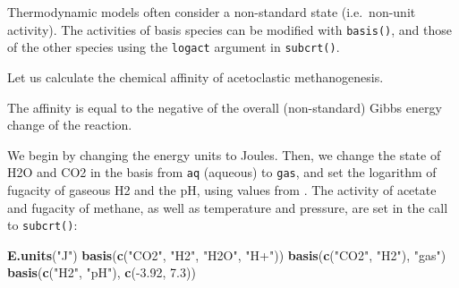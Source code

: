 \documentclass[]{tufte-book}
\newenvironment{Shaded}{}{}
\newcommand{\KeywordTok}[1]{\textcolor[rgb]{0.00,0.44,0.13}{\textbf{#1}}}
\newcommand{\DataTypeTok}[1]{\textcolor[rgb]{0.56,0.13,0.00}{#1}}
\newcommand{\DecValTok}[1]{\textcolor[rgb]{0.25,0.63,0.44}{#1}}
\newcommand{\FloatTok}[1]{\textcolor[rgb]{0.25,0.63,0.44}{#1}}
\newcommand{\StringTok}[1]{\textcolor[rgb]{0.25,0.44,0.63}{#1}}
\newcommand{\OperatorTok}[1]{\textcolor[rgb]{0.40,0.40,0.40}{#1}}
\newcommand{\NormalTok}[1]{#1}
\begin{document}
Thermodynamic models often consider a non-standard state (i.e.~non-unit
activity). The activities of basis species can be modified with
{\texttt{basis()}}, and those of the other species using the
\texttt{logact} argument in {\texttt{subcrt()}}.

Let us calculate the chemical affinity of acetoclastic methanogenesis.

\begin{marginfigure}
The affinity is equal to the negative of the overall (non-standard)
Gibbs energy change of the reaction.
\end{marginfigure}

We begin by changing the energy units to Joules. Then, we change the
state of H2O and CO2 in the basis from \texttt{aq} (aqueous) to
\texttt{gas}, and set the logarithm of fugacity of gaseous H2 and the
pH, using values from \citet{MDS_13}. The activity of acetate and
fugacity of methane, as well as temperature and pressure, are set in the
call to {\texttt{subcrt()}}:

\begin{Shaded}
\begin{Highlighting}[]
\KeywordTok{E.units}\NormalTok{(}\StringTok{"J"}\NormalTok{)}
\KeywordTok{basis}\NormalTok{(}\KeywordTok{c}\NormalTok{(}\StringTok{"CO2"}\NormalTok{, }\StringTok{"H2"}\NormalTok{, }\StringTok{"H2O"}\NormalTok{, }\StringTok{"H+"}\NormalTok{))}
\KeywordTok{basis}\NormalTok{(}\KeywordTok{c}\NormalTok{(}\StringTok{"CO2"}\NormalTok{, }\StringTok{"H2"}\NormalTok{), }\StringTok{"gas"}\NormalTok{)}
\KeywordTok{basis}\NormalTok{(}\KeywordTok{c}\NormalTok{(}\StringTok{"H2"}\NormalTok{, }\StringTok{"pH"}\NormalTok{), }\KeywordTok{c}\NormalTok{(}\OperatorTok{-}\FloatTok{3.92}\NormalTok{, }\FloatTok{7.3}\NormalTok{))}
\end{Highlighting}
\end{Shaded}

\begin{Shaded}
\end{Shaded}
\end{document}
